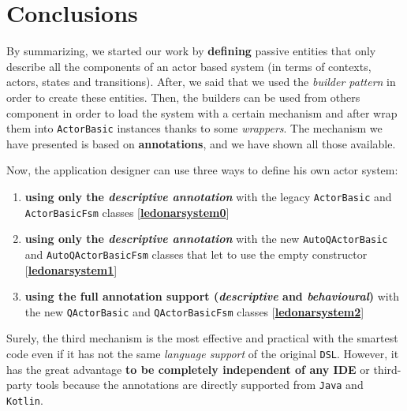 \section{Conclusions}

By summarizing, we started our work by \textbf{defining} passive entities that only describe all the components of an actor based system (in terms of contexts, actors, states and transitions).
After, we said that we used the \textit{builder pattern} in order to create these entities. Then, the builders can be used from others component in order to load the system with a certain mechanism and after wrap them into \texttt{ActorBasic} instances thanks to some \textit{wrappers}.
The mechanism we have presented is based on \textbf{annotations}, and we have shown all those available.

Now, the application designer can use three ways to define his own actor system:
\begin{enumerate}
	\item \textbf{using only the \textit{descriptive annotation}} with the legacy \texttt{ActorBasic} and \texttt{ActorBasicFsm} classes [\href{https://github.com/LM-96/QA-Extensions/tree/main/it.unibo.ledsonardemo0}{\textcolor{Emerald}{\textbf{ledonarsystem0}}}]
	
	\item \textbf{using only the \textit{descriptive annotation}} with the new \texttt{AutoQActorBasic} and \texttt{AutoQActorBasicFsm} classes that let to use the empty constructor [\href{https://github.com/LM-96/QA-Extensions/tree/main/it.unibo.ledsonardemo1}{\textcolor{Emerald}{\textbf{ledonarsystem1}}}]
	
	\item \textbf{using the full annotation support (\textit{descriptive} and \textit{behavioural})} with the new \texttt{QActorBasic} and \texttt{QActorBasicFsm} classes [\href{https://github.com/LM-96/QA-Extensions/tree/main/it.unibo.ledsonardemo2}{\textcolor{Emerald}{\textbf{ledonarsystem2}}}]
\end{enumerate}

Surely, the third mechanism is the most effective and practical with the smartest code even if it has not the same \textit{language support} of the original \texttt{DSL}. However, it has the great advantage \textbf{to be completely independent of any IDE} or third-party tools because the annotations are directly supported from \texttt{Java} and \texttt{Kotlin}.




